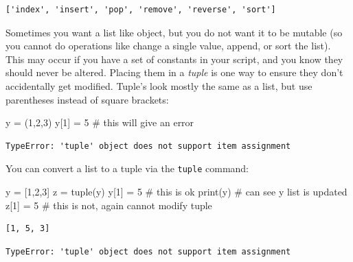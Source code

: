 \documentclass[
  letterpaper,
]{scrbook}
\newenvironment{Shaded}{\begin{snugshade}}{\end{snugshade}}
\newcommand{\BuiltInTok}[1]{\textcolor[rgb]{0.00,0.23,0.31}{#1}}
\newcommand{\CommentTok}[1]{\textcolor[rgb]{0.37,0.37,0.37}{#1}}
\newcommand{\DecValTok}[1]{\textcolor[rgb]{0.68,0.00,0.00}{#1}}
\newcommand{\NormalTok}[1]{\textcolor[rgb]{0.00,0.23,0.31}{#1}}
\newcommand{\OperatorTok}[1]{\textcolor[rgb]{0.37,0.37,0.37}{#1}}
\begin{document}
\begin{verbatim}
['index', 'insert', 'pop', 'remove', 'reverse', 'sort']
\end{verbatim}

Sometimes you want a list like object, but you do not want it to be
mutable (so you cannot do operations like change a single value, append,
or sort the list). This may occur if you have a set of constants in your
script, and you know they should never be altered. Placing them in a
\emph{tuple} is one way to ensure they don't accidentally get modified.
Tuple's look mostly the same as a list, but use parentheses instead of
square brackets:

\begin{Shaded}
\begin{Highlighting}[]
\NormalTok{y }\OperatorTok{=}\NormalTok{ (}\DecValTok{1}\NormalTok{,}\DecValTok{2}\NormalTok{,}\DecValTok{3}\NormalTok{)}
\NormalTok{y[}\DecValTok{1}\NormalTok{] }\OperatorTok{=} \DecValTok{5} \CommentTok{\# this will give an error}
\end{Highlighting}
\end{Shaded}

\begin{verbatim}
TypeError: 'tuple' object does not support item assignment
\end{verbatim}

You can convert a list to a tuple via the \texttt{tuple} command:

\begin{Shaded}
\begin{Highlighting}[]
\NormalTok{y }\OperatorTok{=}\NormalTok{ [}\DecValTok{1}\NormalTok{,}\DecValTok{2}\NormalTok{,}\DecValTok{3}\NormalTok{]}
\NormalTok{z }\OperatorTok{=} \BuiltInTok{tuple}\NormalTok{(y)}
\NormalTok{y[}\DecValTok{1}\NormalTok{] }\OperatorTok{=} \DecValTok{5} \CommentTok{\# this is ok}
\BuiltInTok{print}\NormalTok{(y) }\CommentTok{\# can see y list is updated}
\NormalTok{z[}\DecValTok{1}\NormalTok{] }\OperatorTok{=} \DecValTok{5} \CommentTok{\# this is not, again cannot modify tuple}
\end{Highlighting}
\end{Shaded}

\begin{verbatim}
[1, 5, 3]
\end{verbatim}

\begin{verbatim}
TypeError: 'tuple' object does not support item assignment
\end{verbatim}
\end{document}
